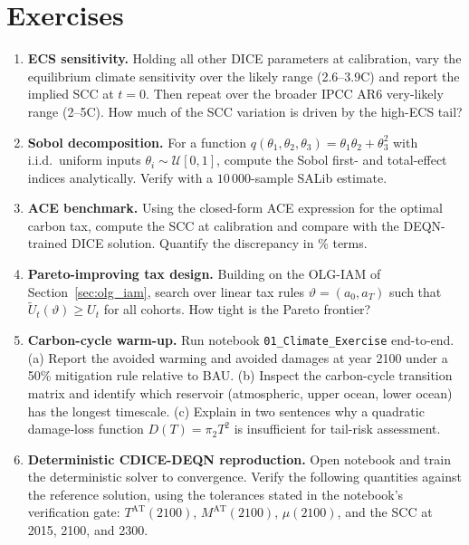 \documentclass[11pt,a4paper]{report}
\begin{document}
\section*{Exercises}
\begin{enumerate}[itemsep=4pt, leftmargin=*]
\item\label{ex:ch11:1} \textbf{ECS sensitivity.}  Holding all other DICE parameters at calibration, vary the equilibrium climate sensitivity over the \citet{sherwood2020assessment} likely range (2.6--3.9\textdegree C) and report the implied SCC at $t=0$.  Then repeat over the broader IPCC AR6 very-likely range (2--5\textdegree C).  How much of the SCC variation is driven by the high-ECS tail?
\item\label{ex:ch11:2} \textbf{Sobol decomposition.}  For a function $q(\theta_1, \theta_2, \theta_3) = \theta_1\theta_2 + \theta_3^2$ with i.i.d.\ uniform inputs $\theta_i \sim \mathcal{U}[0,1]$, compute the Sobol first- and total-effect indices analytically.  Verify with a $10\,000$-sample SALib estimate.
\item\label{ex:ch11:3} \textbf{ACE benchmark.}  Using the closed-form ACE expression for the optimal carbon tax, compute the SCC at calibration and compare with the DEQN-trained DICE solution.  Quantify the discrepancy in \% terms.
\item\label{ex:ch11:4} \textbf{Pareto-improving tax design.}  Building on the OLG-IAM of Section~\ref{sec:olg_iam}, search over linear tax rules $\vartheta = (a_0, a_T)$ such that $\tilde U_t(\vartheta) \ge U_t$ for all cohorts.  How tight is the Pareto frontier?
\item\label{ex:ch11:5} \textbf{Carbon-cycle warm-up.}  Run notebook \texttt{01\_Climate\_Exercise} end-to-end.  (a) Report the avoided warming and avoided damages at year 2100 under a 50\% mitigation rule relative to BAU.  (b) Inspect the carbon-cycle transition matrix and identify which reservoir (atmospheric, upper ocean, lower ocean) has the longest timescale.  (c) Explain in two sentences why a quadratic damage-loss function $D(T) = \pi_2 T^2$ is insufficient for tail-risk assessment.
\item\label{ex:ch11:6} \textbf{Deterministic CDICE-DEQN reproduction.}  Open notebook  and train the deterministic solver to convergence.  Verify the following quantities against the reference solution, using the tolerances stated in the notebook's verification gate: $T^{\mathrm{AT}}(2100)$, $M^{\mathrm{AT}}(2100)$, $\mu(2100)$, and the SCC at 2015, 2100, and 2300.

\end{enumerate}
\end{document}
